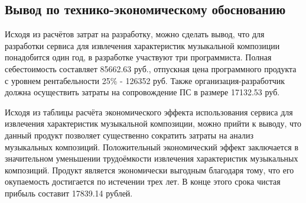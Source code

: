\subsection{Вывод по технико-экономическому обоснованию}
\label{sec:economics:conclusion}
Исходя из расчётов затрат на разработку, можно сделать вывод, что для разработки сервиса для извлечения характеристик музыкальной композиции понадобится один год, в разработке участвуют три программиста. Полная себестоимость составляет 85662.63 руб., отпускная цена программного продукта с уровнем рентабельности 25\% - 126352 руб. Также организация-разработчик должна осуществить затраты на сопровождение ПС в размере 17132.53 руб.

Исходя из таблицы расчёта экономического эффекта использования сервиса для извлечения характеристик музыкальной композиции, можно \linebreak прийти к выводу, что данный продукт позволяет существенно сократить затраты на анализ музыкальных композиций. Положительный экономический эффект заключается в значительном уменьшении трудоёмкости извлечения характеристик музыкальных композиций. Продукт является экономически выгодным благодаря тому, что его окупаемость достигается по истечении трех лет. В конце этого срока чистая прибыль составит 17839.14 рублей.
